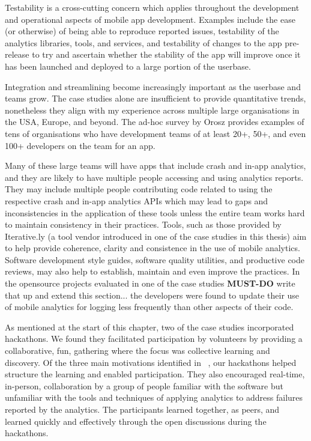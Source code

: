 Testability is a cross-cutting concern which applies throughout the development and operational aspects of mobile app development. Examples include the ease (or otherwise) of being able to reproduce reported issues, testability of the analytics libraries, tools, and services, and testability of changes to the app pre-release to try and ascertain whether the stability of the app will improve once it has been launched and deployed to a large portion of the userbase.






Integration and streamlining become increasingly important as the userbase and teams grow. The case studies alone are insufficient to provide quantitative trends, nonetheless they align with my experience across multiple large organisations in the USA, Europe, and beyond. The ad-hoc survey by Orosz provides examples of tens of organisations who have development teams of at least 20+, 50+, and even 100+ developers on the team for an app.


Many of these large teams will have apps that include crash and in-app analytics, and they are likely to have multiple people accessing and using analytics reports. They may include multiple people contributing code related to using the respective crash and in-app analytics APIs which may lead to gaps and inconsistencies in the application of these tools unless the entire team works hard to maintain consistency in their practices. Tools, such as those provided by Iterative.ly (a tool vendor introduced in one of the case studies in this thesis) aim to help provide coherence, clarity and consistence in the use of mobile analytics. Software development style guides, software quality utilities, and productive code reviews, may also help to establish, maintain and even improve the practices. In the opensource projects evaluated in one of the case studies \textbf{MUST-DO} write that up and extend this section... the developers were found to update their use of mobile analytics for logging less frequently than other aspects of their code.



As mentioned at the start of this chapter, two of the case studies incorporated hackathons. We found they facilitated participation by volunteers by providing a collaborative, fun, gathering where the focus was collective learning and discovery. Of the three main motivations identified in ~\citep{olesen2020_10_years_of_hackathons}, our hackathons helped structure the learning and enabled participation. They also encouraged real-time, in-person, collaboration by a group of people familiar with the software but unfamiliar with the tools and techniques of applying analytics to address failures reported by the analytics. The participants learned together, as peers, and learned quickly and effectively through the open discussions during the hackathons.